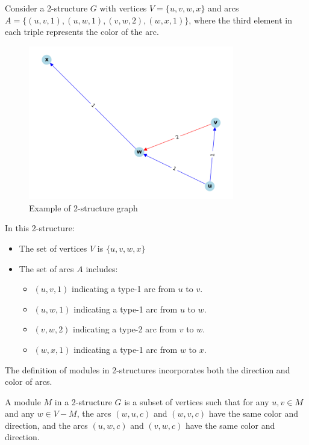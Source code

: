 \begin{myex}[2-Structure]
    Consider a 2-structure $G$ with vertices $V = \{u, v, w, x\}$ and arcs $A = \{(u, v, 1), (u, w, 1), (v, w, 2), (w, x, 1)\}$, where the third element in each triple represents the color of the arc.

    \begin{figure}[!h]
        \centering
        \includegraphics[width=0.80\textwidth]{images/graphs/2_structure_graph_example}
        \caption{Example of 2-structure graph}
        \label{fig:2-structure-graph-example-simple}
    \end{figure}

    In this 2-structure:
    \begin{itemize}
        \item The set of vertices $V$ is $\{u, v, w, x\}$
        \item The set of arcs $A$ includes:
        \begin{itemize}
            \item $(u, v, 1)$ indicating a type-1 arc from $u$ to $v$.
            \item $(u, w, 1)$ indicating a type-1 arc from $u$ to $w$.
            \item $(v, w, 2)$ indicating a type-2 arc from $v$ to $w$.
            \item $(w, x, 1)$ indicating a type-1 arc from $w$ to $x$.
        \end{itemize}
    \end{itemize}
\end{myex}


The definition of modules in 2-structures incorporates both the direction and color of arcs.

\begin{mydef}
    A module $M$ in a 2-structure $G$ is a subset of vertices such that for any $u, v \in M$ and any $w \in V - M$, the arcs $(w, u, c)$ and $(w, v, c)$ have the same color and direction, and the arcs $(u, w, c)$ and $(v, w, c)$ have the same color and direction.
\end{mydef}


